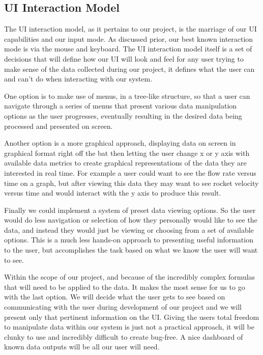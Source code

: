 \documentclass[10pt,draftclsnofoot,onecolumn,retainorgcmds]{IEEEtran}
\begin{document}
\subsection{UI Interaction Model}
The UI interaction model, as it pertains to our project, is the marriage of our UI capabilities and our input mode. As discussed prior, our best known interaction mode is via the mouse and keyboard. The UI interaction model itself is a set of decisions that will define how our UI will look and feel for any user trying to make sense of the data collected during our project, it defines what the user can and can't do when interacting with our system.\par
One option is to make use of menus, in a tree-like structure, so that a user can navigate through a series of menus that present various data manipulation options as the user progresses, eventually resulting in the desired data being processed and presented on screen.\par
Another option is a more graphical approach, displaying data on screen in graphical format right off the bat then letting the user change x or y axis with available data metrics to create graphical representations of the data they are interested in real time. For example a user could want to see the flow rate versus time on a graph, but after viewing this data they may want to see rocket velocity versus time and would interact with the y axis to produce this result.\par
Finally we could implement a system of preset data viewing options. So the user would do less navigation or selection of how they personally would like to see the data, and instead they would just be viewing or choosing from a set of available options. This is a much less hands-on approach to presenting useful information to the user, but accomplishes the task based on what we know the user will want to see.\par
Within the scope of our project, and because of the incredibly complex formulas that will need to be applied to the data. It makes the most sense for us to go with the last option. We will decide what the user gets to see based on communicating with the user during development of our project and we will present only that pertinent information on the UI. Giving the users total freedom to manipulate data within our system is just not a practical approach, it will be clunky to use and incredibly difficult to create bug-free. A nice dashboard of known data outputs will be all our user will need.\par
\end{document}
